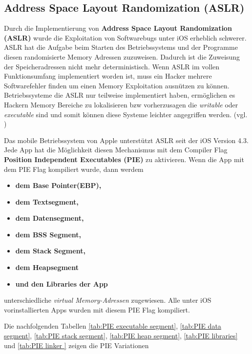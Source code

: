 \subsection{Address Space Layout Randomization (ASLR)}
\label{sec:ASLR}

Durch die Implementierung von \textbf{Address Space Layout Randomization (ASLR)} wurde die Exploitation von Softwarebugs unter iOS erheblich schwerer. ASLR hat die Aufgabe beim Starten des Betriebssystems und der Programme diesen randomisierte Memory Adressen zuzuweisen. Dadurch ist die Zuweisung der Speicheradressen nicht mehr deterministisch. Wenn ASLR im vollen Funktionsumfang implementiert worden ist, muss ein Hacker mehrere Softwarefehler finden um einen Memory Exploitation ausnützen zu können. Betriebssysteme die ASLR nur teilweise implementiert haben, ermöglichen es Hackern Memory Bereiche zu lokalisieren bzw vorherzusagen die \textit{\glqq writable\grqq{}} oder \textit{\glqq executable\grqq{}} sind und somit können diese Systeme leichter angegriffen werden. (vgl. \cite{Apple[4], ASLR[1], ASLR[2]}) \par

Das mobile Betriebssystem von Apple unterstützt ASLR seit der iOS Version 4.3. Jede App hat die Möglichkeit diesen Mechanismus mit dem Compiler Flag \textbf{Position Independent Executables (PIE)} zu aktivieren. Wenn die App mit dem PIE Flag kompiliert wurde, dann werdem
\begin{itemize}
    \item \textbf{dem Base Pointer(EBP),}
    \item \textbf{dem Textsegment,} 
    \item \textbf{dem Datensegment,}
    \item \textbf{dem BSS Segment,} 
    \item \textbf{dem Stack Segment,}
    \item \textbf{dem Heapsegment}
    \item \textbf{und den Libraries der App}
\end{itemize}
unterschiedliche \textit{\glqq virtual Memory-Adressen\grqq{}} zugewiesen. Alle unter iOS vorinstallierten Apps wurden mit diesem PIE Flag kompiliert. 

Die nachfolgenden Tabellen \ref{tab:PIE executable segment}, \ref{tab:PIE data segment}, \ref{tab:PIE stack segment}, \ref{tab:PIE heap segment}, \ref{tab:PIE libraries} und \ref{tab:PIE linker } zeigen die PIE Variationen

